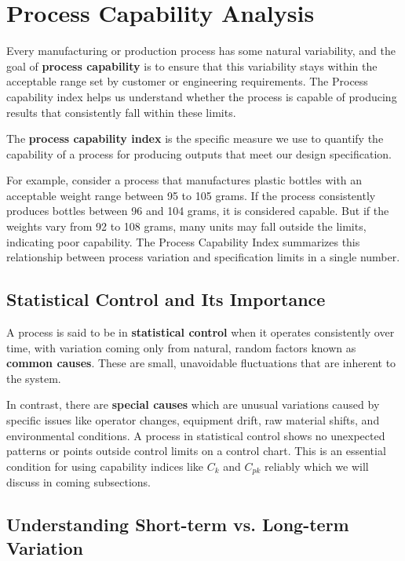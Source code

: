 \documentclass[twoside]{book}
\begin{document}
\section{Process Capability Analysis}

Every manufacturing or production process has some natural variability, and the goal of \textbf{process capability} is to ensure that this variability stays within the acceptable range set by customer or engineering requirements. The Process capability index helps us understand whether the process is capable of producing results that consistently fall within these limits.

\begin{textbox}
The \textbf{process capability index} is the specific measure we use to quantify the capability of a process for producing outputs that meet our design specification.
\end{textbox}

For example, consider a process that manufactures plastic bottles with an acceptable weight range between 95 to 105 grams. If the process consistently produces bottles between 96 and 104 grams, it is considered capable. But if the weights vary from 92 to 108 grams, many units may fall outside the limits, indicating poor capability. The Process Capability Index summarizes this relationship between process variation and specification limits in a single number.

\subsection{Statistical Control and Its Importance}

A process is said to be in \textbf{statistical control} when it operates consistently over time, with variation coming only from natural, random factors known as \textbf{common causes}. These are small, unavoidable fluctuations that are inherent to the system.

In contrast, there are \textbf{special causes} which are unusual variations caused by specific issues like operator changes, equipment drift, raw material shifts, and environmental conditions. A process in statistical control shows no unexpected patterns or points outside control limits on a control chart. This is an essential condition for using capability indices like $C_k$ and $C_{pk}$ reliably which we will discuss in coming subsections.

\subsection{Understanding Short-term vs. Long-term Variation}
\end{document}
